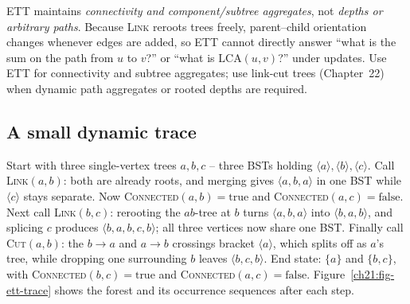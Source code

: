 \begin{trapbox}
ETT maintains \emph{connectivity and component/subtree aggregates}, not \emph{depths or arbitrary paths}. Because \textsc{Link} reroots trees freely, parent--child orientation changes whenever edges are added, so ETT cannot directly answer ``what is the sum on the path from $u$ to $v$?'' or ``what is $\mathrm{LCA}(u,v)$?'' under updates. Use ETT for connectivity and subtree aggregates; use link-cut trees (Chapter~22) when dynamic path aggregates or rooted depths are required.
\end{trapbox}

\subsection{A small dynamic trace}

\begin{labbox}
Start with three single-vertex trees $a,b,c$ -- three BSTs holding $\langle a\rangle,
\langle b\rangle,\langle c\rangle$. Call \textsc{Link}$(a,b)$: both are already roots, and merging gives
$\langle a,b,a\rangle$ in one BST while $\langle c\rangle$ stays separate. Now
\textsc{Connected}$(a,b)=\text{true}$ and \textsc{Connected}$(a,c)=\text{false}$. Next call \textsc{Link}$(b,c)$:
rerooting the $ab$-tree at $b$ turns $\langle a,b,a\rangle$ into $\langle b,a,b\rangle$, and splicing $c$ produces
$\langle b,a,b,c,b\rangle$; all three vertices now share one BST. Finally call \textsc{Cut}$(a,b)$:
the $b\!\to\!a$ and $a\!\to\!b$ crossings bracket $\langle a\rangle$, which
splits off as $a$'s tree, while dropping one surrounding $b$ leaves $\langle b,c,b\rangle$. End state:
$\{a\}$ and $\{b,c\}$, with \textsc{Connected}$(b,c)=\text{true}$ and
\textsc{Connected}$(a,c)=\text{false}$. Figure~\ref{ch21:fig-ett-trace} shows the forest and
its occurrence sequences after each step.
\end{labbox}


